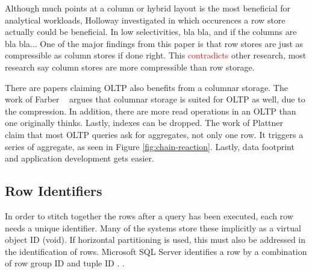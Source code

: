 Although much points at a column or hybrid layout is the most beneficial for analytical workloads, Holloway \ea \cite{Holloway2008-rr} investigated in which occurences a row store actually could be beneficial. In low selectivities, bla bla, and if the columns are bla bla... One of the major findings from this paper is that row stores are just as compressible as column stores if done right. This \textcolor{red}{contradicts} other research, most research say column stores are more compressible than row storage. 

There are papers claiming OLTP also benefits from a columnar storage. The work of Farber \ea~\cite{Farber2012-vh} argues that columnar storage is suited for OLTP as well, due to the compression. In addition, there are more read operations in an OLTP than one originally thinks. Lastly, indexes can be dropped. The work of Plattner \ea~\cite{Plattner2014-fr} claim that most OLTP queries ask for aggregates, not only one row. It triggers a series of aggregate, as seen in Figure \ref{fig:chain-reaction}. Lastly, data footprint and application development gets easier.

\subsection{Row Identifiers}
\label{sub:Row Identifiers}
In order to stitch together the rows after a query has been executed, each row needs a unique identifier. Many of the systems store these implicitly \cite{Boncz2002-yj, Raman2013-em, Stonebraker2005-qz, Lamb2012-kg} as a virtual object ID (void). If horizontal partitioning is used, this must also be addressed in the identification of rows. Microsoft SQL Server identifies a row by a combination of row group ID and tuple ID \cite{Larson2013-mc}. .

